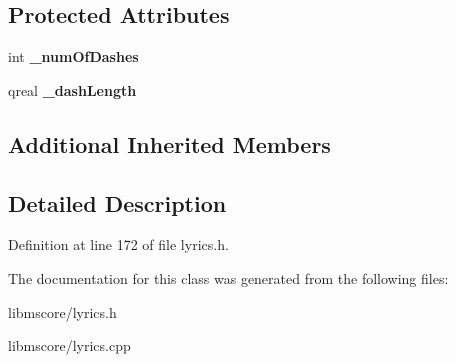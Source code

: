 \subsection*{Protected Attributes}
\begin{DoxyCompactItemize}
\item 
\mbox{\label{class_ms_1_1_lyrics_line_segment_abaac58f776eaa1da32d7f768c7ca98f3}} 
int {\bfseries \+\_\+num\+Of\+Dashes}
\item 
\mbox{\label{class_ms_1_1_lyrics_line_segment_a7b18e0ba3dcf61a4b653c11126559f92}} 
qreal {\bfseries \+\_\+dash\+Length}
\end{DoxyCompactItemize}
\subsection*{Additional Inherited Members}


\subsection{Detailed Description}


Definition at line 172 of file lyrics.\+h.



The documentation for this class was generated from the following files\+:\begin{DoxyCompactItemize}
\item 
libmscore/lyrics.\+h\item 
libmscore/lyrics.\+cpp\end{DoxyCompactItemize}

